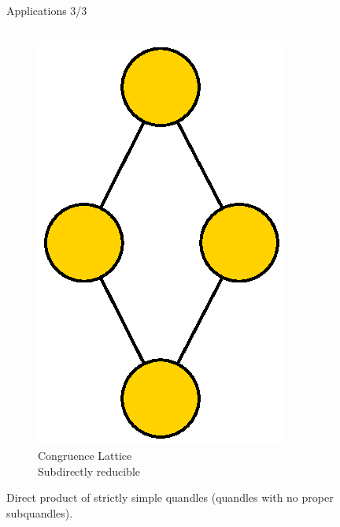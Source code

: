 \begin{frame}{Applications 3/3}
\small
\begin{columns}
\begin{column}{0.3\textwidth}

\begin{figure}[H]
    \centering
    \includegraphics[scale = 0.5]{Thesis/images/Coloured28_2LatticeGraph.eps}
    \caption{Congruence Lattice \\ Subdirectly reducible}
    \label{fig:my_label}
\end{figure}
Direct product of strictly simple quandles (quandles with no proper subquandles).
\end{column}
\begin{column}{0.3\textwidth}


\end{column}
\end{columns}
\end{frame}
